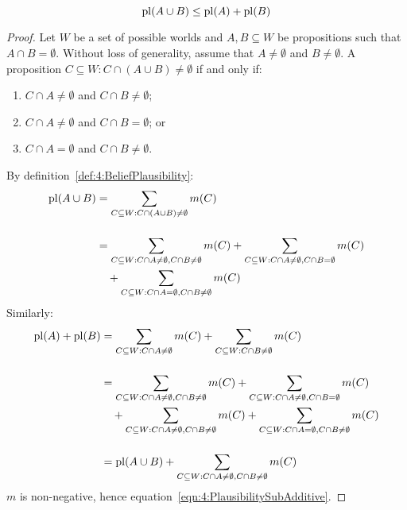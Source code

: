 \begin{thm}
  \begin{equation}
    \label{eqn:4:PlausibilitySubAdditive}
    \operatorname*{pl}(A \cup B) \leq \operatorname*{pl}(A) + \operatorname*{pl}(B)
  \end{equation}

  \begin{proof}
    Let $W$ be a set of possible worlds and $A, B \subseteq W$ be propositions
    such that $A \cap B = \emptyset$.
    Without loss of generality, assume that $A \neq \emptyset$ and
    $B \neq \emptyset$.
    A proposition $C \subseteq W : C \cap (A \cup B) \neq \emptyset$ if and only
    if:
    \begin{enumerate}
      \item $C \cap A \neq \emptyset$ and $C \cap B \neq \emptyset$;
      \item $C \cap A \neq \emptyset$ and $C \cap B = \emptyset$; or
      \item $C \cap A = \emptyset$ and $C \cap B \neq \emptyset$.
    \end{enumerate}
    By definition~\ref{def:4:BeliefPlausibility}:
    \begin{align*}
      \operatorname*{pl}(A \cup B)
       & = \sum_{C \subseteq W : C \cap (A \cup B) \neq \emptyset} m(C)                    \\[3ex]
       & = \sum_{C \subseteq W : C \cap A \neq \emptyset, C \cap B \neq \emptyset} m(C)
      + \sum_{C \subseteq W : C \cap A \neq \emptyset, C \cap B = \emptyset} m(C)          \\
       & \quad + \sum_{C \subseteq W : C \cap A = \emptyset, C \cap B \neq \emptyset} m(C)
    \end{align*}
    Similarly:
    \begin{align*}
      \operatorname*{pl}(A) + \operatorname*{pl}(B)
       & =
      \sum_{C \subseteq W : C \cap A \neq \emptyset} m(C) +
      \sum_{C \subseteq W : C \cap B \neq \emptyset} m(C)
      \\[3ex]
       & =
      \sum_{C \subseteq W : C \cap A \neq \emptyset, C \cap B \neq \emptyset} m(C) +
      \sum_{C \subseteq W : C \cap A \neq \emptyset, C \cap B = \emptyset} m(C)
      \\
       & \quad +
      \sum_{C \subseteq W : C \cap A \neq \emptyset, C \cap B \neq \emptyset} m(C) +
      \sum_{C \subseteq W : C \cap A = \emptyset, C \cap B \neq \emptyset} m(C)
      \\[3ex]
       & =
      \operatorname*{pl}(A \cup B) +
      \sum_{C \subseteq W : C \cap A \neq \emptyset, C \cap B \neq \emptyset} m(C)
    \end{align*}
    $m$ is non-negative, hence equation~\ref{eqn:4:PlausibilitySubAdditive}.
  \end{proof}
\end{thm}

